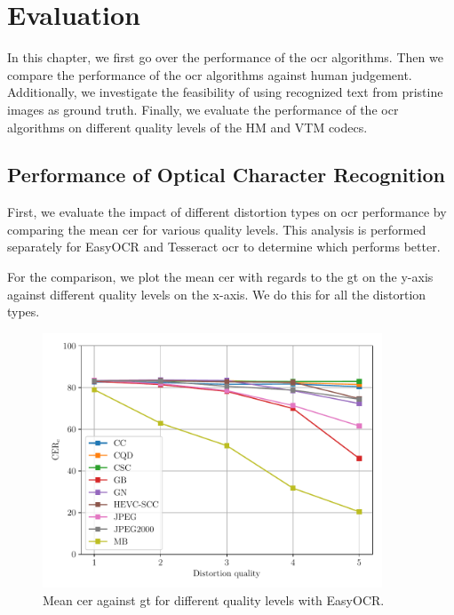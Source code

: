 \chapter{Evaluation}
\label{chap:evaluation}

In this chapter, we first go over the performance of the \gls{ocr} algorithms.
Then we compare the performance of the \gls{ocr} algorithms against human judgement.
Additionally, we investigate the feasibility of using recognized text from pristine images as ground truth.
Finally, we evaluate the performance of the \gls{ocr} algorithms on different quality levels of the HM and VTM codecs.

\section{Performance of Optical Character Recognition}
\label{sec:ocr_performance}

First, we evaluate the impact of different distortion types on \gls{ocr} performance by comparing the mean \gls{cer} for various quality levels.
This analysis is performed separately for EasyOCR and Tesseract \gls{ocr} to determine which performs better.

For the comparison, we plot the mean \gls{cer} with regards to the \gls{gt} on the y-axis against different quality levels on the x-axis.
We do this for all the distortion types.

\begin{figure}[h]
\centering
    \includegraphics[width=0.9\textwidth]{../../images/analyze/cer_dist_quality_gt_ezocr.pdf}
    \caption{Mean \gls{cer} against \gls{gt} for different quality levels with EasyOCR.}
\label{fig:cer_dist_quality_gt_ezocr}
\end{figure}

